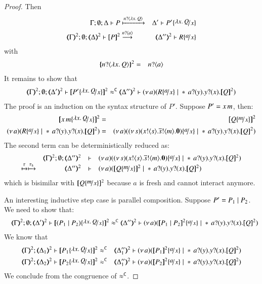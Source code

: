 \begin{proof}
	\noi Then
%
	\begin{eqnarray*}
		\Gamma; \es; \Delta \proves P &\hby{\bactinp{n}{\abs{x}{Q}}}& \Delta' \proves P' \subst{\abs{x}{Q}}{x}\\
		\tmap{\Gamma}{2}; \es; \tmap{\Delta}{2} \proves \pmap{P}{2} &\by{\bactinp{n}{a}}& \tmap{\Delta''}{2} \proves R \subst{a}{x}
	\end{eqnarray*}
%
	\noi with
%
	\begin{eqnarray*}
		\{\!\!\{n ? \langle \lambda x.\,Q \rangle\}\!\!\}^{2} &=& n ? \langle a \rangle
	\end{eqnarray*}
%
	It remains to show that
%
	\begin{eqnarray*}
		\tmap{\Gamma}{2}; \es; \tmap{\Delta'}{2} \proves \pmap{P' \subst{\abs{x}{Q}}{x}}{2} \fwb
		\tmap{\Delta''}{2} \proves \newsp{a}{R \subst{a}{x} \Par \repl{} \binp{a}{y} \binp{y}{x} \pmap{Q}{2}}
	\end{eqnarray*}
%
	\noi The proof is an induction on the syntax structure of $P'$.
	Suppose $P' = x\, {m}$, then:
%
	\begin{eqnarray*}
		\pmap{\appl{x}{m} \subst{\abs{x}{Q}}{x}}{2} &=& \pmap{Q \subst{m}{x}}{2}\\
		\newsp{a}{R \subst{a}{x} \Par \repl{} \binp{a}{y} \binp{y}{x} \pmap{Q}{2}} &=& \newsp{a}{\newsp{s}{ \bout{x}{s} \bout{\dual{s}}{m} \inact} \subst{a}{x} \Par \repl{} \binp{a}{y} \binp{y}{x} \pmap{Q}{2}}
	\end{eqnarray*}
%
	\noi The second term can be deterministically reduced as:
%
	\begin{eqnarray*}
		\mhorel{\tmap{\Gamma}{2}}{\tmap{\Delta''}{2}}{\newsp{a}{\newsp{s}{ \bout{x}{s} \bout{\dual{s}}{m} \inact} \subst{a}{x} \Par \repl{} \binp{a}{y} \binp{y}{x} \pmap{Q}{2}}}
		{\hby{\tau} \hby{\stau}}
		{\tmap{\Delta''}{2}}{}{\newsp{a}{\pmap{Q \subst{m}{x}}{2} \Par \repl{} \binp{a}{y} \binp{y}{x} \pmap{Q}{2}}}
	\end{eqnarray*}
%
	\noi which is bisimilar with		$\pmap{Q \subst{m}{x}}{2}$ because $a$ is fresh and cannot interact anymore.

	\noi An interesting inductive step case is parallel composition. Suppose $P' = P_1 \;|\; P_2$. We need to show that:
%
	\begin{eqnarray*}
		&& \tmap{\Gamma}{2}; \es; \tmap{\Delta'}{2} \proves \pmap{(P_1 \Par P_2) \subst{\abs{x}{Q}}{x}}{2} \fwb
		\tmap{\Delta''}{2} \proves \newsp{a}{\pmap{P_1 \Par P_2}{2} \subst{a}{x} \Par \repl{} \binp{a}{y} \binp{y}{x} \pmap{Q}{2}}
	\end{eqnarray*}
%
	\noi We know that
%
	\begin{eqnarray*}
		\horel{\tmap{\Gamma}{2}}{\tmap{\Delta_1}{2}}{\pmap{P_1\subst{\abs{x}{Q}}{x}}{2}}{&\fwb&}
		{\tmap{\Delta_1''}{2}}{\newsp{a}{\pmap{P_1}{2} \subst{a}{x} \Par \repl{} \binp{a}{y} \binp{y}{x} \pmap{Q}{2}}}\\
		\horel{\tmap{\Gamma}{2}}{\tmap{\Delta_2}{2}}{\pmap{P_2\subst{\abs{x}{Q}}{x}}{2}}{&\fwb&}
		{\tmap{\Delta_1''}{2}}{\newsp{a}{\pmap{P_2}{2} \subst{a}{x} \Par \repl{} \binp{a}{y} \binp{y}{x} \pmap{Q}{2}}}
	\end{eqnarray*}
%
	\noi We conclude from the congruence of $\approx^\mathtt{C}$.


\end{proof}
